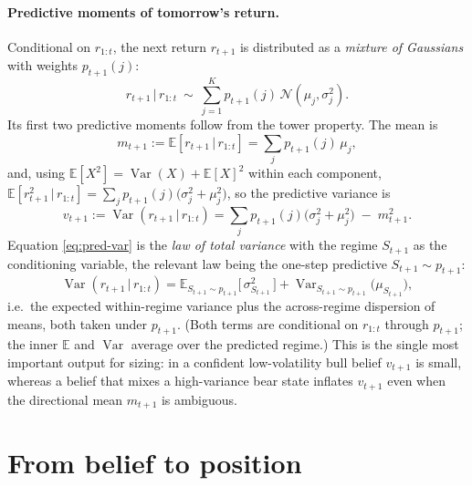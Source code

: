 \documentclass[11pt]{article}
\newcommand{\E}{\mathbb{E}}
\newcommand{\Var}{\operatorname{Var}}
\newcommand{\Normal}{\mathcal{N}}
\newcommand{\given}{\,\vert\,}
\newcommand{\eqdef}{:=}
\newcommand{\state}{S}
\newcommand{\obs}{r}
\newcommand{\nstate}{K}
\theoremstyle{plain}
\theoremstyle{definition}
\theoremstyle{remark}
\begin{document}
\paragraph{Predictive moments of tomorrow's return.}
Conditional on $\obs_{1:t}$, the next return $\obs_{t+1}$ is distributed as a
\emph{mixture of Gaussians} with weights $p_{t+1}(j)$:
\begin{equation}
  \obs_{t+1}\given\obs_{1:t} \ \sim\ \sum_{j=1}^{\nstate} p_{t+1}(j)\,\Normal(\mu_j,\sigma_j^2).
\end{equation}
Its first two predictive moments follow from the tower property. The mean is
\begin{equation}\label{eq:pred-mean}
  m_{t+1}\eqdef\E[\obs_{t+1}\given\obs_{1:t}] = \sum_j p_{t+1}(j)\,\mu_j ,
\end{equation}
and, using $\E[X^2]=\Var(X)+\E[X]^2$ within each component,
$\E[\obs_{t+1}^2\given\obs_{1:t}]=\sum_j p_{t+1}(j)\big(\sigma_j^2+\mu_j^2\big)$, so the
predictive variance is
\begin{equation}\label{eq:pred-var}
  v_{t+1}\eqdef\Var(\obs_{t+1}\given\obs_{1:t})
  = \sum_{j} p_{t+1}(j)\big(\sigma_j^2+\mu_j^2\big) \;-\; m_{t+1}^2 .
\end{equation}
Equation \eqref{eq:pred-var} is the \emph{law of total variance} with the regime
$\state_{t+1}$ as the conditioning variable, the relevant law being the one-step
predictive $\state_{t+1}\sim p_{t+1}$:
\begin{equation}
  \Var(\obs_{t+1}\given\obs_{1:t})
  = \E_{\state_{t+1}\sim p_{t+1}}\!\big[\,\sigma^2_{\state_{t+1}}\,\big]
  + \Var_{\state_{t+1}\sim p_{t+1}}\!\big(\mu_{\state_{t+1}}\big),
\end{equation}
i.e.\ the expected within-regime variance plus the across-regime dispersion of
means, both taken under $p_{t+1}$. (Both terms are conditional on $\obs_{1:t}$
through $p_{t+1}$; the inner $\E$ and $\Var$ average over the predicted regime.)
This is the single most important output for sizing: in a confident
low-volatility bull belief $v_{t+1}$ is small, whereas a belief that mixes a
high-variance bear state inflates $v_{t+1}$ even when the directional mean
$m_{t+1}$ is ambiguous.

\section{From belief to position}\label{sec:trading}
\end{document}
